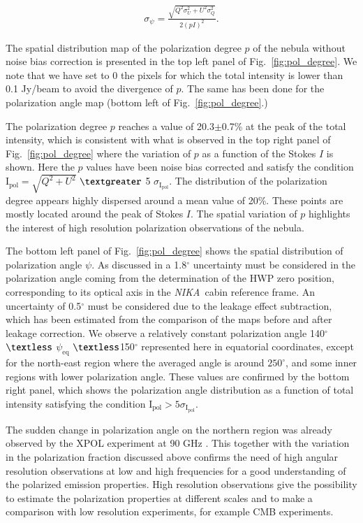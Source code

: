 \documentclass[twocolumn,traditabstract]{aa}
\def\NIKA{\textit{NIKA}}
\begin{document}
  \begin{eqnarray}\label{angle_uncertainty}
  \sigma_{\psi} = \frac{\sqrt{Q^2\sigma_U^2 + U^2\sigma_Q^2}}{2(pI)^2}.  \end{eqnarray}

The spatial distribution map of the polarization degree $p$ of the  nebula
without noise bias correction is presented in the top left panel of
Fig.~\ref{fig:pol_degree}. We note that we have set to 0 the pixels for which the total intensity is lower than 0.1 Jy/beam to avoid the divergence of $p$. The same has been done for the polarization angle map (bottom left of Fig.~\ref{fig:pol_degree}.)

The polarization degree $p$ reaches a value of 20.3$\pm$0.7\% at
the peak of the total intensity, which is consistent with what is observed in the
top right panel of Fig.~\ref{fig:pol_degree} where the variation of $p$ as a
function of the Stokes $I$ is shown.  Here the $p$ values have been noise bias
corrected and satisfy the condition $\textrm{I}_{\textrm{pol}}=\sqrt{Q^2+U^2}$ $\textgreater$ 5
$\sigma_{\textrm{I}_{\textrm{pol}}}$. The distribution of the polarization degree appears highly
dispersed around a mean value of 20\%. These points are mostly located around the peak of Stokes $I$. 
The spatial variation of $p$ highlights the interest of high resolution polarization
observations of the  nebula. 

The bottom left panel of Fig.~\ref{fig:pol_degree} shows the spatial distribution of polarization angle
$\psi$. As discussed in \cite{ritacco2017} a 1.8$^{\circ}$ uncertainty must be considered in the polarization angle coming from the determination of the HWP zero position, corresponding to its optical axis in the \NIKA\ cabin reference frame. An uncertainty of 0.5$^{\circ}$ must be considered due to the leakage effect subtraction, which has been estimated from the comparison of the maps before and after leakage correction. We observe a relatively constant polarization
angle 140$^{\circ}$ $\textless$ $\psi_{\textrm{eq}}$ $\textless$150$^{\circ}$ represented here in equatorial coordinates, except
for the north-east region where the averaged angle is around $250^{\circ}$, and
some inner regions with lower polarization angle.  These values are confirmed by
the bottom right panel, which shows the polarization angle distribution as a
function of total intensity satisfying the condition ${\textrm{I}_{\textrm{pol}}} > 5\sigma_{{\textrm{I}_{\textrm{pol}}}}$.

The sudden change in polarization angle on the northern region was already
observed by the XPOL experiment at 90 GHz \citep{aumont2010}.  This together
with the variation in the polarization fraction discussed above confirms the
need of high angular resolution observations at low and high frequencies for a
good understanding of the  polarized emission properties.
High resolution observations give the possibility to estimate the polarization properties at different scales and to make a comparison  with low resolution experiments, for example CMB experiments.
\end{document}
